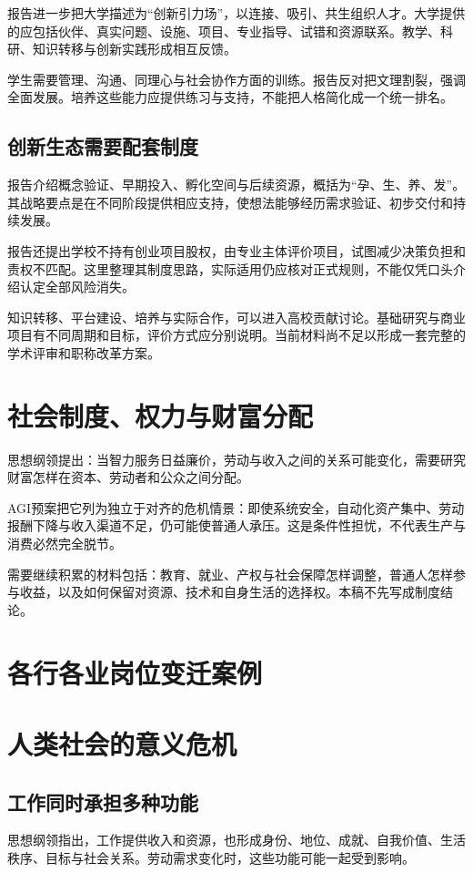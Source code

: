 \documentclass[UTF8,zihao=-4,fontset=fandol,oneside,openany]{ctexbook}
\begin{document}
报告进一步把大学描述为“创新引力场”，以连接、吸引、共生组织人才。大学提供的应包括伙伴、真实问题、设施、项目、专业指导、试错和资源联系。教学、科研、知识转移与创新实践形成相互反馈。

学生需要管理、沟通、同理心与社会协作方面的训练。报告反对把文理割裂，强调全面发展。培养这些能力应提供练习与支持，不能把人格简化成一个统一排名。

\subsection*{创新生态需要配套制度}
报告介绍概念验证、早期投入、孵化空间与后续资源，概括为“孕、生、养、发”。其战略要点是在不同阶段提供相应支持，使想法能够经历需求验证、初步交付和持续发展。

报告还提出学校不持有创业项目股权，由专业主体评价项目，试图减少决策负担和责权不匹配。这里整理其制度思路，实际适用仍应核对正式规则，不能仅凭口头介绍认定全部风险消失。

知识转移、平台建设、培养与实际合作，可以进入高校贡献讨论。基础研究与商业项目有不同周期和目标，评价方式应分别说明。当前材料尚不足以形成一套完整的学术评审和职称改革方案。

\section{社会制度、权力与财富分配}
思想纲领提出：当智力服务日益廉价，劳动与收入之间的关系可能变化，需要研究财富怎样在资本、劳动者和公众之间分配\cite{principles}。

AGI预案把它列为独立于对齐的危机情景：即使系统安全，自动化资产集中、劳动报酬下降与收入渠道不足，仍可能使普通人承压\cite{agi}。这是条件性担忧，不代表生产与消费必然完全脱节。

需要继续积累的材料包括：教育、就业、产权与社会保障怎样调整，普通人怎样参与收益，以及如何保留对资源、技术和自身生活的选择权。本稿不先写成制度结论。

\section{各行各业岗位变迁案例}

\clearpage
\section{人类社会的意义危机}
\subsection*{工作同时承担多种功能}
思想纲领指出，工作提供收入和资源，也形成身份、地位、成就、自我价值、生活秩序、目标与社会关系\cite{principles}。劳动需求变化时，这些功能可能一起受到影响。
\end{document}
